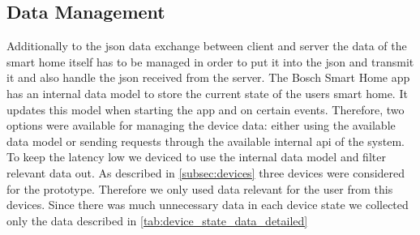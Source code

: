\subsection{Data Management}
Additionally to the \gls{json} data exchange between client and server the data of the smart home itself has to be managed in order to put it into the \gls{json} and transmit it and also handle the \gls{json} received from the server.
The Bosch Smart Home app has an internal data model to store the current state of the users smart home. It updates this model when starting the app and on certain events.
Therefore, two options were available for managing the device data: either using the available data model or sending requests through the available internal \gls{api} of the system.
To keep the latency low we deviced to use the internal data model and filter relevant data out. As described in \cref{subsec:devices} three devices were considered for the prototype.
Therefore we only used data relevant for the user from this devices. Since there was much unnecessary data in each device state we collected only the data described in \cref{tab:device_state_data_detailed}
